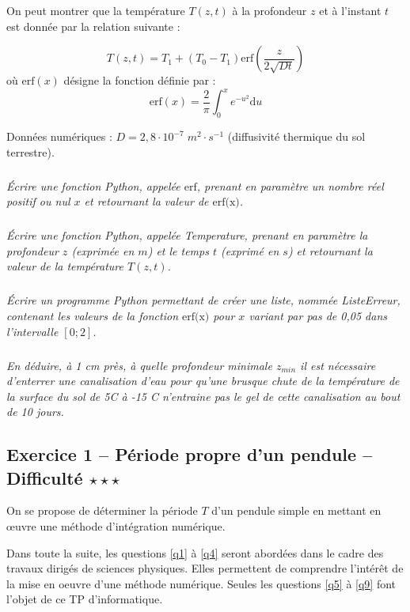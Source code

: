 \documentclass[10pt,oneside]{article}
\begin{document}
On peut montrer que la température $T(z, t)$ à la profondeur $z$ et à l'instant $t$ est donnée par la relation suivante :

$$
T(z,t)=T_1 + (T_0-T_1) \text{erf}\left( \dfrac{z}{2\sqrt{Dt}} \right)
$$
où $\text{erf}(x)$ désigne la fonction définie par :
$$
\text{erf}(x) = \dfrac{2}{\pi}\int^x_0 e^{-u^2} \mathrm{d}u
$$

Données numériques : $D=2,8\cdot 10^{-7} \; m^2\cdot s^{-1}$ (diffusivité thermique du sol terrestre).

\setcounter{subparagraph}{0}
\subparagraph{}
\textit{Écrire une fonction Python, appelée $\text{erf}$, prenant en paramètre un nombre réel positif ou nul $x$ et
retournant la valeur de $\text{erf(x)}$.}

\subparagraph{}
\textit{Écrire une fonction Python, appelée Temperature, prenant en paramètre la profondeur $z$ (exprimée
en $m$) et le temps $t$ (exprimé en $s$) et retournant la valeur de la température $T(z, t)$.}

\subparagraph{}
\textit{Écrire un programme Python permettant de créer une liste, nommée ListeErreur, contenant les
valeurs de la fonction $\text{erf(x)}$ pour $x$ variant par pas de 0,05 dans l'intervalle $[0 ; 2]$.}

\subparagraph{}
\textit{En déduire, à 1 cm près, à quelle profondeur minimale $z_{min}$ il est nécessaire d'enterrer une
canalisation d'eau pour qu'une brusque chute de la température de la surface du sol de 5\textdegree C à -15 \textdegree C
n'entraine pas le gel de cette canalisation au bout de 10 jours.}

\newpage 


\subsection*{Exercice 1 -- Période propre d'un pendule  -- Difficulté $\star\star\star$}
\setcounter{subparagraph}{0}

On se propose de déterminer la période $T$ d'un pendule simple en mettant en \oe{}uvre une méthode d'intégration numérique.

\begin{rem}
Dans toute la suite, les questions \ref{q1} à \ref{q4} seront abordées dans le cadre des travaux
dirigés de sciences physiques. Elles permettent de comprendre l'intérêt de la mise en oeuvre d'une
méthode numérique. Seules les questions \ref{q5} à \ref{q9} font l'objet de ce TP d'informatique.
\end{rem}
\end{document}
